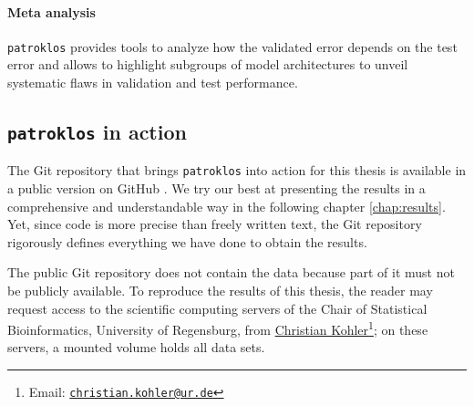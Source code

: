\paragraph{Meta analysis} 
\texttt{patroklos} provides tools to analyze how the validated error depends on the test error and 
allows to highlight subgroups of model architectures to unveil systematic flaws in validation 
and test performance.

\subsection{\texttt{patroklos} in action}

The Git repository that brings \texttt{patroklos} into action for this thesis is available in a 
public version on GitHub \cite{thesis-gh}. We try our best at presenting the results in a 
comprehensive and understandable way in the following chapter \ref{chap:results}. Yet, since code 
is more precise than freely written text, the Git repository rigorously defines everything we have 
done to obtain the results.

The public Git repository does not contain the data because part of it must not be publicly 
available. To reproduce the results of this thesis, the reader may request access to the scientific 
computing servers of the Chair of Statistical Bioinformatics, University of Regensburg, from 
\href{mailto:christian.kohler@ur.de}{Christian Kohler}\footnote{Email: 
\href{mailto:christian.kohler@ur.de}{\texttt{christian.kohler@ur.de}}}; on these servers, a mounted
volume holds all data sets.